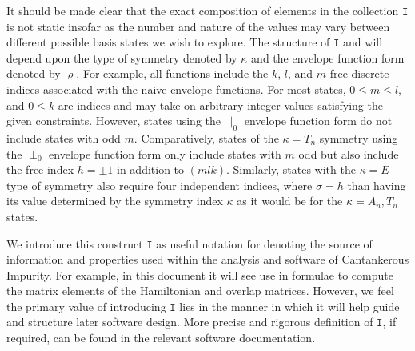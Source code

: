 It should be made clear that the exact composition of elements in the collection
$\mathtt{I}$ is not static insofar as the number and nature of the values may
vary between different possible basis states we wish to explore. The structure
of $\mathtt{I}$ and will depend upon the type of symmetry denoted by $\kappa$
and the envelope function form denoted by $\varrho$. For example, all functions
include the $k$, $l$, and $m$ free discrete indices associated with the naive
envelope functions. For most states, $0\le m\le l$, and $0\le k$ are indices and
may take on arbitrary integer values satisfying the given constraints. However,
states using the $\parallel_{0}$ envelope function form do not include states
with odd $m$. Comparatively, states of the $\kappa = T_{n}$ symmetry using the
$\perp_{0}$ envelope function form only include states with $m$ odd but also
include the free index $h = \pm 1$ in addition to $\left(mlk\right)$. Similarly,
states with the $\kappa = E$ type of symmetry also require four independent
indices, where $\sigma = h$ than having its value determined by the symmetry
index $\kappa$ as it would be for the $\kappa = A_{n},T_{n}$ states.

We introduce this construct $\mathtt{I}$ as useful notation for denoting the
source of information and properties used within the analysis and software of
Cantankerous Impurity. For example, in this document it will see use in formulae
to compute the matrix elements of the Hamiltonian and overlap matrices. However,
we feel the primary value of introducing $\mathtt{I}$ lies in the manner in
which it will help guide and structure later software design. More precise and
rigorous definition of $\mathtt{I}$, if required, can be found in the relevant
software documentation.

